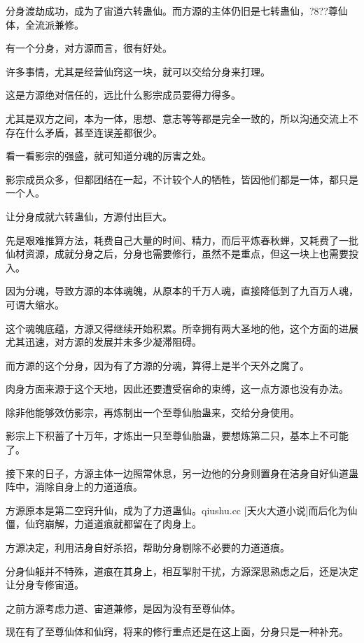 
\begin{this_body}

分身渡劫成功，成为了宙道六转蛊仙。而方源的主体仍旧是七转蛊仙，?8??尊仙体，全流派兼修。

有一个分身，对方源而言，很有好处。

许多事情，尤其是经营仙窍这一块，就可以交给分身来打理。

这是方源绝对信任的，远比什么影宗成员要得力得多。

尤其是双方之间，本为一体，思想、意志等等都是完全一致的，所以沟通交流上不存在什么矛盾，甚至连误差都很少。

看一看影宗的强盛，就可知道分魂的厉害之处。

影宗成员众多，但都团结在一起，不计较个人的牺牲，皆因他们都是一体，都只是一个人。

让分身成就六转蛊仙，方源付出巨大。

先是艰难推算方法，耗费自己大量的时间、精力，而后平炼春秋蝉，又耗费了一批仙材资源，成就分身之后，分身也需要修行，虽然不是重点，但这一块上也需要投入。

因为分魂，导致方源的本体魂魄，从原本的千万人魂，直接降低到了九百万人魂，可谓大缩水。

这个魂魄底蕴，方源又得继续开始积累。所幸拥有两大圣地的他，这个方面的进展尤其迅速，对方源的发展并未多少凝滞阻碍。

而方源的这个分身，因为有了方源的分魂，算得上是半个天外之魔了。

肉身方面来源于这个天地，因此还要遭受宿命的束缚，这一点方源也没有办法。

除非他能够效仿影宗，再炼制出一个至尊仙胎蛊来，交给分身使用。

影宗上下积蓄了十万年，才炼出一只至尊仙胎蛊，要想炼第二只，基本上不可能了。

接下来的日子，方源主体一边照常休息，另一边他的分身则置身在洁身自好仙道蛊阵中，消除自身上的力道道痕。

方源原本是第二空窍升仙，成为了力道蛊仙。qiushu.cc [天火大道小说]而后化为仙僵，仙窍崩解，力道道痕就都留在了肉身上。

方源决定，利用洁身自好杀招，帮助分身剔除不必要的力道道痕。

分身仙躯并不特殊，道痕在其身上，相互掣肘干扰，方源深思熟虑之后，还是决定让分身专修宙道。

之前方源考虑力道、宙道兼修，是因为没有至尊仙体。

现在有了至尊仙体和仙窍，将来的修行重点还是在这上面，分身只是一种补充。


\end{this_body}
